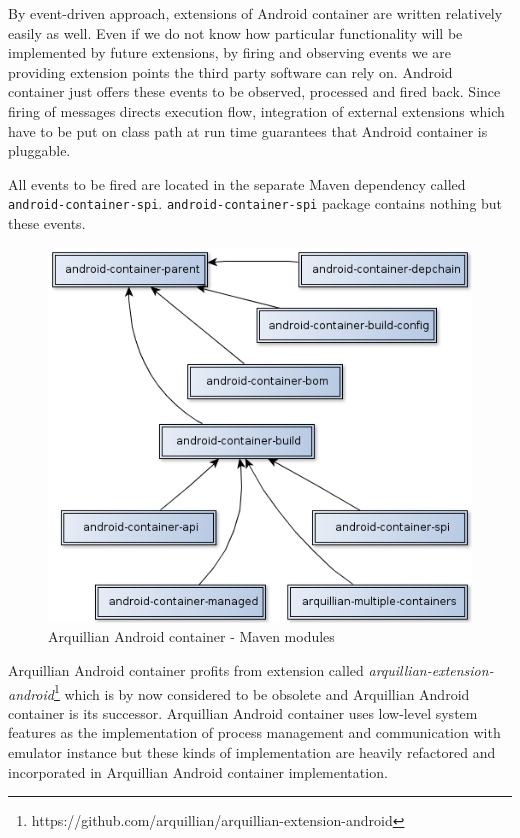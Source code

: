 \documentclass[12pt,final,oneside]{fithesis}
\begin{document}
By event-driven approach, extensions of Android container are written relatively easily as well. Even if we do not know how particular functionality will be implemented by future extensions, by firing and observing events we are providing extension points the third party software can rely on. Android container just offers these events to be observed, processed and fired back. Since firing of messages directs execution flow, integration of external extensions which have to be put on class path at run time guarantees that Android container is pluggable.

All events to be fired are located in the separate Maven dependency called \texttt{android-container-spi}. \texttt{android-container-spi} package contains nothing but these events.

\begin{figure}[h!tb]
	\centering
	\includegraphics[width=.8\textwidth]{resources/android-container-modules.png}
	\caption{Arquillian Android container - Maven modules}
	\label{fig:android_container_maven_modules}
\end{figure}

Arquillian Android container profits from extension called \textit{arquillian-extension-android}\footnote{https://github.com/arquillian/arquillian-extension-android} which is by now considered to be obsolete and Arquillian Android container is its successor.
Arquillian Android container uses low-level system features as the implementation of process management and communication with emulator instance but these kinds of implementation are heavily refactored and incorporated in Arquillian Android container implementation.
\end{document}
